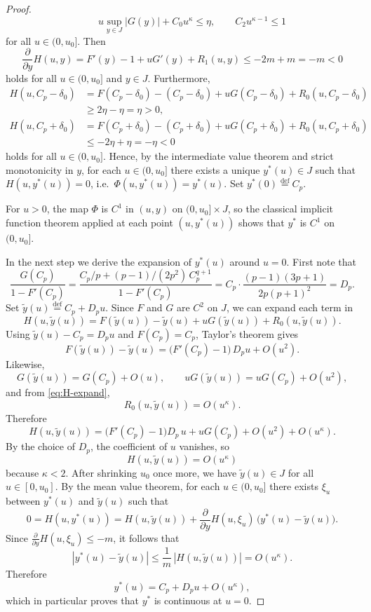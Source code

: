 \documentclass{article}
\newcommand{\defi}{\stackrel{\mathrm{\scriptscriptstyle def}}{=}}
\begin{document}
\begin{proof}
\[        \qquad
        u\sup_{y\in J}|G(y)|+C_0u^\kappa\le \eta,
        \qquad
        C_2u^{\kappa-1}\le 1
    \]
    for all $u\in(0,u_0]$.
    Then
    \[
        \frac{\partial}{\partial y} H(u,y) = F'(y)-1+uG'(y)+R_1(u,y) \le -2m + m = -m < 0
    \]
    holds for all $u\in(0,u_0]$ and $y\in J$.
    Furthermore,
    \begin{align*}
        H(u,C_p-\delta_0) &= F(C_p-\delta_0)-(C_p-\delta_0) + uG(C_p-\delta_0) + R_0(u,C_p-\delta_0) \\
        &\ge 2\eta - \eta = \eta > 0, \\
        H(u,C_p+\delta_0) &= F(C_p+\delta_0)-(C_p+\delta_0) + uG(C_p+\delta_0) + R_0(u,C_p+\delta_0) \\
        &\le -2\eta + \eta = -\eta < 0
    \end{align*}
    holds for all $u\in(0,u_0]$.
    Hence, by the intermediate value theorem and strict monotonicity in $y$, for
    each $u\in(0,u_0]$ there exists a unique $y^*(u)\in J$ such that
    $H(u,y^*(u))=0$, i.e.\ $\Phi(u,y^*(u))=y^*(u)$.
    Set $y^*(0)\defi C_p$.

    For $u>0$, the map $\Phi$ is $C^1$ in $(u,y)$ on $(0,u_0]\times J$, so the
    classical implicit function theorem applied at each point
    $(u,y^*(u))$ shows that $y^*$ is $C^1$ on $(0,u_0]$.

    In the next step we derive the expansion of $y^*(u)$ around $u=0$.
    First note that 
    \[
        \frac{G(C_p)}{1-F'(C_p)} = \frac{C_p/p+(p-1)/(2p^2)\,C_p^{q+1}}{1-F'(C_p)} = C_p\cdot \frac{(p-1)(3p+1)}{2p(p+1)^2} = D_p.
    \]
    Set $\tilde y(u)\defi C_p+D_pu$.
    Since $F$ and $G$ are $C^2$ on $J$, we can expand each term in
    \[
        H(u,\tilde y(u))
        =F(\tilde y(u))-\tilde y(u)+uG(\tilde y(u))+R_0(u,\tilde y(u)).
    \]
    Using $\tilde y(u)-C_p=D_pu$ and $F(C_p)=C_p$, Taylor's theorem gives
    \[
        F(\tilde y(u))-\tilde y(u)
        =\bigl(F'(C_p)-1\bigr)\,D_pu+O(u^2).
    \]
    Likewise,
    \[
        G(\tilde y(u))=G(C_p)+O(u),
        \qquad
        uG(\tilde y(u))=uG(C_p)+O(u^2),
    \]
    and from \eqref{eq:H-expand},
    \[
        R_0(u,\tilde y(u))=O(u^\kappa).
    \]
    Therefore
    \[
        H(u,\tilde y(u))
        = \bigl(F'(C_p)-1\bigr)D_p\,u + uG(C_p) + O(u^2) + O(u^\kappa).
    \]
    By the choice of $D_p$, the coefficient of $u$ vanishes, so
    \[
        H(u,\tilde y(u)) = O(u^\kappa)
    \]
    because $\kappa<2$.
    After shrinking $u_0$ once more, we have $\tilde y(u)\in J$ for all
    $u\in[0,u_0]$.
    By the mean value theorem, for each $u\in(0,u_0]$ there exists $\xi_u$ between
    $y^*(u)$ and $\tilde y(u)$ such that
    \[
        0 = H(u,y^*(u))
        = H(u,\tilde y(u))
        + \frac{\partial}{\partial y} H(u,\xi_u)\,\bigl(y^*(u)-\tilde y(u)\bigr).
    \]
    Since $\frac{\partial}{\partial y} H(u,\xi_u)\le -m$, it follows that
    \[
        |y^*(u)-\tilde y(u)| \le \frac{1}{m}\,|H(u,\tilde y(u))| = O(u^\kappa).
    \]
    Therefore
    \[
        y^*(u)=C_p+D_pu+O(u^\kappa),
    \]
    which in particular proves that $y^*$ is continuous at $u=0$.


\end{proof}
\end{document}
